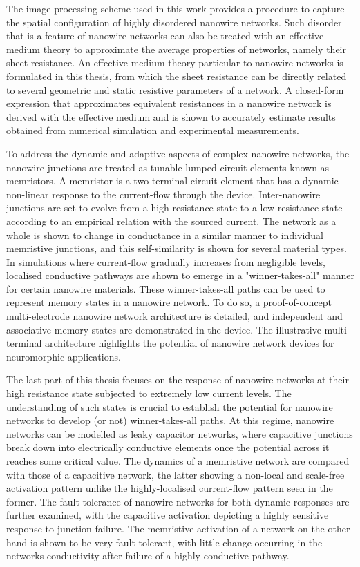\documentclass[
		numbers=noenddot,headinclude=rue,%
                footinclude=true,cleardoublepage=empty,
                BCOR=5mm,paper=a4,fontsize=12pt, %
                ngerman,american, %
                ]{scrreprt}
\begin{document}
The image processing scheme used in this work provides a procedure to capture the spatial configuration of highly disordered nanowire networks. Such disorder that is a feature of nanowire networks can also be treated with an effective medium theory to approximate the average properties of networks, namely their sheet resistance. An effective medium theory particular to nanowire networks is formulated in this thesis, from which the sheet resistance can be directly related to several geometric and static resistive parameters of a network. A closed-form expression that approximates equivalent resistances in a nanowire network is derived with the effective medium and is shown to accurately estimate results obtained from numerical simulation and experimental measurements.

To address the dynamic and adaptive aspects of complex nanowire networks, the nanowire junctions are treated as tunable lumped circuit elements known as memristors. A memristor is a two terminal circuit element that has a dynamic non-linear response to the current-flow through the device. Inter-nanowire junctions are set to evolve from a high resistance state to a low resistance state according to an empirical relation with the sourced current. The network as a whole is shown to change in conductance in a similar manner to individual memristive junctions, and this self-similarity is shown for several material types. In simulations where current-flow gradually increases from negligible levels, localised conductive pathways are shown to emerge in a "winner-takes-all" manner for certain nanowire materials. 
These winner-takes-all paths can be used to represent memory states in a nanowire network. To do so, a proof-of-concept multi-electrode nanowire network architecture is detailed, and independent and associative memory states are demonstrated in the device. The illustrative multi-terminal architecture highlights the potential of nanowire network devices for neuromorphic applications.

The last part of this thesis focuses on the response of nanowire networks at their high resistance state subjected to extremely low current levels. The understanding of such states is crucial to establish the potential for nanowire networks to develop (or not) winner-takes-all paths. At this regime, nanowire networks can be modelled as leaky capacitor networks, where capacitive junctions break down into electrically conductive elements once the potential across it reaches some critical value. The dynamics of a memristive network are compared with those of a capacitive network, the latter showing a non-local and scale-free activation pattern unlike the highly-localised current-flow pattern seen in the former. The fault-tolerance of nanowire networks for both dynamic responses are further examined, with the capacitive activation depicting a highly sensitive response to junction failure. The memristive activation of a network on the other hand is shown to be very fault tolerant, with little change occurring in the networks conductivity after failure of a highly conductive pathway.
\end{document}
